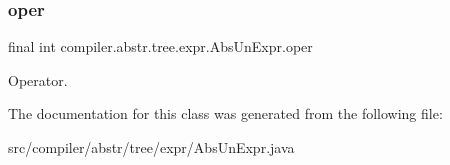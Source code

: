 \subsubsection{\texorpdfstring{oper}{oper}}
{\footnotesize\ttfamily final int compiler.\+abstr.\+tree.\+expr.\+Abs\+Un\+Expr.\+oper}

Operator. 

The documentation for this class was generated from the following file\+:\begin{DoxyCompactItemize}
\item 
src/compiler/abstr/tree/expr/Abs\+Un\+Expr.\+java\end{DoxyCompactItemize}
